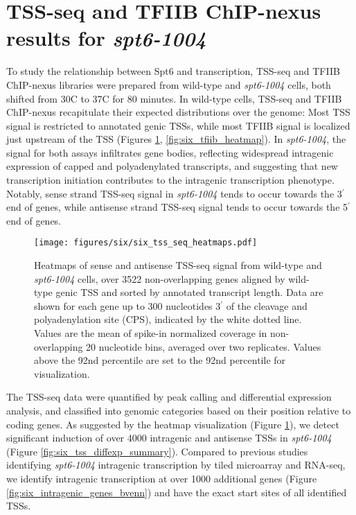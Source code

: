 \section{TSS-seq and TFIIB ChIP-nexus results for \textit{spt6-1004}}

To study the relationship between Spt6 and transcription, TSS-seq and TFIIB ChIP-nexus libraries were prepared from wild-type and \textit{spt6-1004} cells, both shifted from 30\textdegree C to 37\textdegree C for 80 minutes.
In wild-type cells, TSS-seq and TFIIB ChIP-nexus recapitulate their expected distributions over the genome: Most TSS signal is restricted to annotated genic TSSs, while most TFIIB signal is localized just upstream of the TSS (Figures \ref{fig:six_tss_seq_heatmaps}, \ref{fig:six_tfiib_heatmap}).
In \textit{spt6-1004}, the signal for both assays infiltrates gene bodies, reflecting widespread intragenic expression of capped and polyadenylated transcripts, and suggesting that new transcription initiation contributes to the intragenic transcription phenotype.
Notably, sense strand TSS-seq signal in \textit{spt6-1004} tends to occur towards the 3$^\prime$ end of genes, while antisense strand TSS-seq signal tends to occur towards the 5$^\prime$ end of genes.

\begin{figure}[H]
\centering
\texttt{[image: figures/six/six\_tss\_seq\_heatmaps.pdf]}
\caption[Heatmaps of sense and antisense TSS-seq signal from wild-type and \textit{spt6-1004} cells, over non-overlapping coding genes.]{Heatmaps of sense and antisense TSS-seq signal from wild-type and \textit{spt6-1004} cells, over 3522 non-overlapping genes aligned by wild-type genic TSS and sorted by annotated transcript length. Data are shown for each gene up to 300 nucleotides 3$^\prime$ of the cleavage and polyadenylation site (CPS), indicated by the white dotted line. Values are the mean of spike-in normalized coverage in non-overlapping 20 nucleotide bins, averaged over two replicates. Values above the 92nd percentile are set to the 92nd percentile for visualization.}
\label{fig:six_tss_seq_heatmaps}
\end{figure}

The TSS-seq data were quantified by peak calling and differential expression analysis, and classified into genomic categories based on their position relative to coding genes.
As suggested by the heatmap visualization (Figure \ref{fig:six_tss_seq_heatmaps}), we detect significant induction of over 4000 intragenic and antisense TSSs in \textit{spt6-1004} (Figure \ref{fig:six_tss_diffexp_summary}).
Compared to previous studies identifying \textit{spt6-1004} intragenic transcription by tiled microarray and RNA-seq, we identify intragenic transcription at over 1000 additional genes (Figure \ref{fig:six_intragenic_genes_bvenn}) and have the exact start sites of all identified TSSs.

